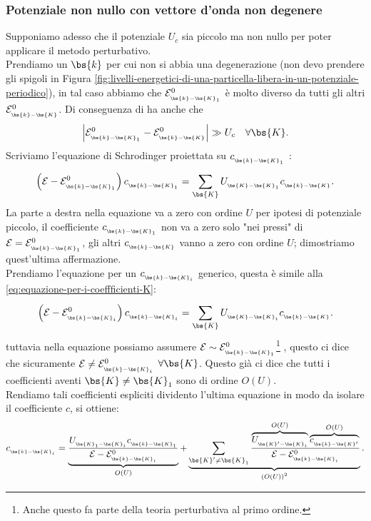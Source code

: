 \subsubsection{Potenziale non nullo con vettore d'onda non degenere}
\label{subsubsec:Potenziale non nullo con vettore d'onda non degenere}
Supponiamo adesso che il potenziale $U_c$ sia piccolo ma non nullo per poter applicare il metodo perturbativo. \\
Prendiamo un $\bs{k}$ per cui non si abbia una degenerazione (non devo prendere gli spigoli in Figura \ref{fig:livelli-energetici-di-una-particella-libera-in-un-potenziale-periodico}), in tal caso abbiamo che $\mathcal{E}^0_{_{\bs{k}-\bs{K}_1}}$ è molto diverso da tutti gli altri $\mathcal{E}^0_{_{\bs{k}-\bs{K}}}$. Di conseguenza di ha anche che
\[
	\left| \mathcal{E}^0_{_{\bs{k}-\bs{K}_1}} - 
	\mathcal{E}^0_{_{\bs{k}-\bs{K}}}  \right| \gg 
	U_c \quad
	\forall \bs{K}
.\]	
Scriviamo l'equazione di Schrodinger proiettata su $c_{_{\bs{k}-\bs{K}_1}}$ :
\[
	\left( \mathcal{E}  - \mathcal{E}^0_{_{\bs{k}-\bs{K}_1}} \right)
	c_{_{\bs{k}-\bs{K}_1}} 
	=
	\sum_{\bs{K}}^{} U_{_{\bs{K}-\bs{K}_1}}c_{_{\bs{k}-\bs{K}}} 
	\label{eq:equazione-per-i-coeffficienti-K}
.\] 
La parte a destra nella equazione va a zero con ordine $U$ per ipotesi di potenziale piccolo, il coefficiente $c_{_{\bs{k}-\bs{K}_1}}$ non va a zero solo "nei pressi" di $ \mathcal{E} = \mathcal{E}^0_{_{\bs{k}-\bs{K}_1}}$,
gli altri $c_{_{\bs{k}-\bs{K}}}$ vanno a zero con ordine $U$; dimostriamo quest'ultima affermazione.\\
Prendiamo l'equazione per un $c_{_{\bs{k}-\bs{K}_i}}$ generico,
questa è simile alla \ref{eq:equazione-per-i-coeffficienti-K}:
\[
	\left( \mathcal{E}  - \mathcal{E}^0_{_{\bs{k}-\bs{K}_i}} \right)
	c_{_{\bs{k}-\bs{K}_i}} 
	=
	\sum_{\bs{K}}^{} U_{_{\bs{K}-\bs{K}_i}}c_{_{\bs{k}-\bs{K}}} 
.\] 
tuttavia nella equazione possiamo assumere $\mathcal{E}  \sim \mathcal{E}^0_{_{\bs{k}-\bs{K}_1}}$\footnote{Anche questo fa parte della teoria perturbativa al primo ordine.} ,
questo ci dice che sicuramente $\mathcal{E}  \neq \mathcal{E}^0_{_{\bs{k}-\bs{K}_i}}$ $\forall \bs{K}$. Questo già ci dice che tutti i coefficienti aventi $\bs{K} \neq \bs{K}_1$ sono di ordine $O(U)$. \\
Rendiamo tali coefficienti espliciti dividento l'ultima equazione in modo da isolare il coefficiente $c$, si ottiene:
\[
	c_{_{\bs{k}-\bs{K}_i}} = 
	\underbrace{
	\frac{U_{_{\bs{K}_1-\bs{K}_i}}c_{_{\bs{k}-\bs{K}_1}}}
	{\mathcal{E}-\mathcal{E}^0_{_{\bs{k}-\bs{K}_i}}}
	}_{
	O(U)}
	+
	\underbrace{
	\sum_{\bs{K}' \neq \bs{K}_1}^{} 
	\frac{
	\overbrace{
	U_{_{\bs{K}'-\bs{K}_i}}
	}^{O(U)}
	\overbrace{
	c_{_{\bs{k}-\bs{K}'}}
	}^{O(U)}}
	{\mathcal{E}-\mathcal{E}^0_{_{\bs{k}-\bs{K}_i}}}
	}_{\left( O(U) \right) ^2}
.\] 
